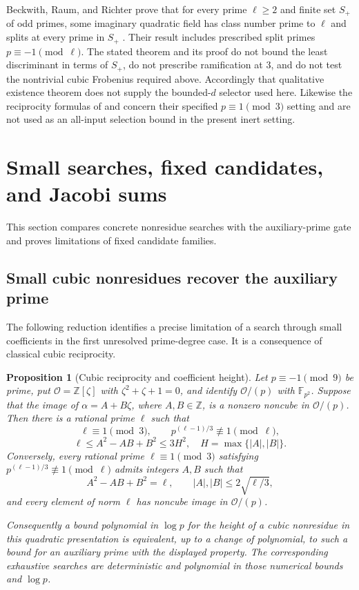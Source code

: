 \documentclass[11pt]{article}
\newtheorem{proposition}[theorem]{Proposition}
\theoremstyle{definition}
\theoremstyle{remark}
\begin{document}
Beckwith, Raum, and Richter prove that for every prime
$\ell\ge2$ and finite set $S_+$ of odd primes, some
imaginary quadratic field has class number prime to
$\ell$ and splits at every prime in $S_+$
\cite[Theorem~A]{BeckwithRaumRichter2024}.
Their result includes prescribed split primes
$p\equiv-1\pmod\ell$.  The stated theorem and its
proof do not bound the least discriminant in terms of
$S_+$, do not prescribe ramification at $3$, and do not
test the nontrivial cubic Frobenius required above.
Accordingly that qualitative existence theorem does not
supply the bounded-$d$ selector used here.
Likewise the reciprocity formulas of
\cite[Theorem~1.6]{EvansEtAl2025Hasse} and
\cite[Theorem~1.1]{EvansVanVeen2026Cubic} concern their
specified $p\equiv1\pmod3$ setting and are not used as
an all-input selection bound in the present inert setting.

\section{Small searches, fixed candidates, and Jacobi sums}
This section compares concrete nonresidue searches with the auxiliary-prime gate and proves limitations of fixed candidate families.

\subsection{Small cubic nonresidues recover the auxiliary prime}
\label{subsec:cubic-small-candidates}

The following reduction identifies a precise limitation of a search
through small coefficients in the first unresolved prime-degree case.
It is a consequence of classical cubic reciprocity.

\begin{proposition}[Cubic reciprocity and coefficient height]
\label{prop:cubic-height-prime}
Let $p\equiv-1\pmod 9$ be prime, put
$\mathcal O=\mathbb Z[\zeta]$ with $\zeta^2+\zeta+1=0$, and identify
$\mathcal O/(p)$ with $\mathbb F_{p^2}$.
Suppose that the image of $\alpha=A+B\zeta$, where $A,B\in\mathbb Z$,
is a nonzero noncube in $\mathcal O/(p)$.
Then there is a rational prime $\ell$ such that
\[
 \ell\equiv1\pmod3,\qquad
 p^{(\ell-1)/3}\not\equiv1\pmod\ell,
\]
\[
 \ell\le A^2-AB+B^2\le3H^2,
 \quad H=\max\{|A|,|B|\}.
\]
Conversely, every rational prime $\ell\equiv1\pmod3$ satisfying
$p^{(\ell-1)/3}\not\equiv1\pmod\ell$ admits integers $A,B$ such that
\[
 A^2-AB+B^2=\ell,\qquad
 |A|,|B|\le2\sqrt{\ell/3},
\]
and every element of norm $\ell$ has noncube image in
$\mathcal O/(p)$.

Consequently a bound polynomial in $\log p$ for the height of a
cubic nonresidue in this quadratic presentation is equivalent, up to
a change of polynomial, to such a bound for an auxiliary prime
with the displayed property. The corresponding exhaustive searches
are deterministic and polynomial in those numerical bounds and
$\log p$.
\end{proposition}
\end{document}
